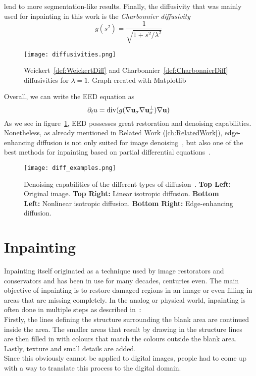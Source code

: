 lead to more segmentation-like results.
Finally, the diffusivity that was mainly used for inpainting in this work is the
\textit{Charbonnier diffusivity}~\cite{charbonnier}
\begin{equation}
    g(s^2) = \frac{1}{\sqrt{1 + s^2 / \lambda^2}}\label{def:CharbonnierDiff}
\end{equation}
\begin{figure}[H]
    \centering
    \texttt{[image: diffusivities.png]}
    \caption{Weickert~\eqref{def:WeickertDiff} and Charbonnier~\eqref{def:CharbonnierDiff}
    diffusivities for $\lambda = 1$. Graph created with Matplotlib~\cite{matplotlib}}
\end{figure}
\noindent Overall, we can write the EED equation as
\begin{equation}
    \partial_t u = \operatorname{div}(g(\mathbf{\nabla} \mathbf{u}_\sigma\mathbf{\nabla} \mathbf{u}_\sigma^\bot)\mathbf{\nabla} \mathbf{u})\label{def:EED}
\end{equation}
As we see in figure~\ref{fig:DiffExamples}, EED possesses great restoration and denoising
capabilities. Nonetheless, as already mentioned in Related Work (\ref{ch:RelatedWork}), edge-enhancing
diffusion is not
only suited for image denoising~\cite{galic05, weickert96}, but also one of the best methods for inpainting based on partial
differential equations~\cite{galic08, schmaltz09, schmaltz14}.
\begin{figure}[H]
    \centering
    \texttt{[image: diff\_examples.png]}
    \caption{Denoising capabilities of the different types of diffusion~\cite{weickert96}. \textbf{Top Left:} Original
        image. \textbf{Top Right:} Linear isotropic diffusion. \textbf{Bottom Left:} Nonlinear
    isotropic diffusion. \textbf{Bottom Right:} Edge-enhancing diffusion.}\label{fig:DiffExamples}
\end{figure}

\section{Inpainting}\label{sec:Inpainting}
Inpainting itself originated as a technique used by image restorators and conservators and has
been in use for many decades, centuries even. The main objective of inpainting is
to restore damaged regions in an image or even filling in areas that are missing
completely. In the analog or physical world, inpainting is often done in multiple steps as
described in~\cite{bertalmio00}:\\
Firstly, the lines defining the structure surrounding the blank area are continued inside the area.
The smaller areas that result by drawing in the structure lines are then filled in with colours that
match the colours outside the blank area.
Lastly, texture and small details are added.\\
Since this obviously cannot be applied to digital images, people had to come up with a way to
translate this process to the digital domain.


